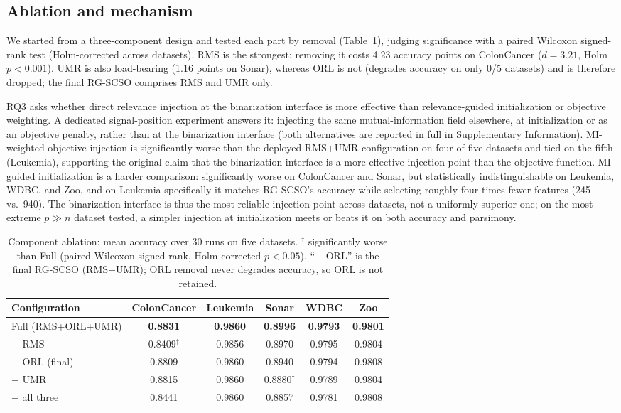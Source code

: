 \documentclass[iicol,sn-basic,pdflatex]{sn-jnl}
\begin{document}
\subsection{Ablation and mechanism}
\label{sec:ablation}
We started from a three-component design and tested each part by removal (Table~\ref{tab:ablation}), judging significance with a paired Wilcoxon signed-rank test (Holm-corrected across datasets). RMS is the strongest: removing it costs 4.23 accuracy points on ColonCancer ($d=3.21$, Holm $p<0.001$). UMR is also load-bearing (1.16 points on Sonar), whereas ORL is not (degrades accuracy on only 0/5 datasets) and is therefore dropped; the final RG-SCSO comprises RMS and UMR only.

RQ3 asks whether direct relevance injection at the binarization interface is more effective than relevance-guided initialization or objective weighting. A dedicated signal-position experiment answers it: injecting the same mutual-information field elsewhere, at initialization or as an objective penalty, rather than at the binarization interface (both alternatives are reported in full in Supplementary Information). MI-weighted objective injection is significantly worse than the deployed RMS+UMR configuration on four of five datasets and tied on the fifth (Leukemia), supporting the original claim that the binarization interface is a more effective injection point than the objective function. MI-guided initialization is a harder comparison: significantly worse on ColonCancer and Sonar, but statistically indistinguishable on Leukemia, WDBC, and Zoo, and on Leukemia specifically it matches RG-SCSO's accuracy while selecting roughly four times fewer features (245 vs.\ 940). The binarization interface is thus the most reliable injection point across datasets, not a uniformly superior one; on the most extreme $p\gg n$ dataset tested, a simpler injection at initialization meets or beats it on both accuracy and parsimony.

\begin{table}[t]
\centering
\caption{Component ablation: mean accuracy over 30 runs on five datasets. $^\dagger$ significantly worse than Full (paired Wilcoxon signed-rank, Holm-corrected $p<0.05$). ``$-$ ORL'' is the final RG-SCSO (RMS+UMR); ORL removal never degrades accuracy, so ORL is not retained.}
\label{tab:ablation}
\footnotesize
\begin{tabular}{lccccc}
\toprule
Configuration & ColonCancer & Leukemia & Sonar & WDBC & Zoo \\
\midrule
Full (RMS+ORL+UMR) & \textbf{0.8831} & \textbf{0.9860} & \textbf{0.8996} & \textbf{0.9793} & \textbf{0.9801} \\
$-$ RMS & 0.8409$^\dagger$ & 0.9856 & 0.8970 & 0.9795 & 0.9804 \\
$-$ ORL (final) & 0.8809 & 0.9860 & 0.8940 & 0.9794 & 0.9808 \\
$-$ UMR & 0.8815 & 0.9860 & 0.8880$^\dagger$ & 0.9789 & 0.9804 \\
$-$ all three & 0.8441 & 0.9860 & 0.8857 & 0.9781 & 0.9808 \\
\bottomrule
\end{tabular}
\end{table}
\end{document}
